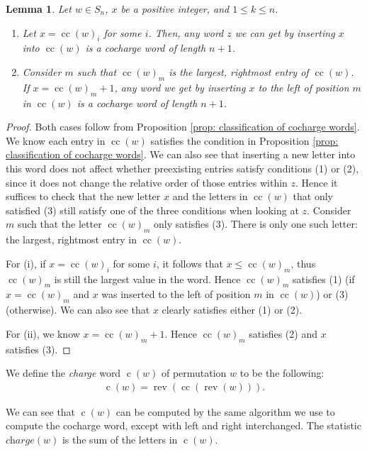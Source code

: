 \documentclass[10pt]{amsart}
\theoremstyle{plain}
\theoremstyle{definition}
\theoremstyle{plain}
\newtheorem{lemma}[lemma]{Lemma}
\theoremstyle{plain}
\theoremstyle{remark}
\theoremstyle{plain}
\theoremstyle{plain}
\DeclareMathOperator{\rev}{rev}
\DeclareMathOperator{\cc}{cc}
\DeclareMathOperator{\cw}{c}
\begin{document}
\begin{lemma}\label{lemma: adding a repeated cocharge value is still a cc word}
Let $w\in S_n$, $x$ be a positive integer, and $1\leq k\leq n$. 
\begin{enumerate}[label=(\roman*)]
    \item Let $x = \cc(w)_i$ for some $i$. Then, any word $z$ we can get by inserting $x$ into $\cc(w)$ is a cocharge word of length $n+1$.
    \item Consider $m$ such that $\cc(w)_m$ is the largest, rightmost entry of $\cc(w)$. If $x = \cc(w)_m + 1$, any word we get by inserting $x$ to the left of position $m$ in $\cc(w)$ is a cocharge word of length $n+1$.
\end{enumerate}

\end{lemma}
\begin{proof}
Both cases follow from Proposition \ref{prop: classification of cocharge words}.
We know each entry in  $\cc(w)$ satisfies the condition in Proposition \ref{prop: classification of cocharge words}. We can also see that inserting a new letter into this word does not affect whether preexisting entries satisfy conditions (1) or (2), since it does not change the relative order of those entries within $z$. 
Hence it suffices to check that the new letter $x$ and the letters in $\cc(w)$ that only satisfied (3) still satisfy one of the three conditions when looking at $z$.
 Consider $m$ such that the letter $\cc(w)_m$ only satisfies (3). There is only one such letter: the largest, rightmost entry in $\cc(w)$. 

 For (i),  if $x = \cc(w)_i$ for some $i$, it follows that  $x \leq \cc(w)_m$, thus $\cc(w)_m$ is still the largest value in the word. Hence $\cc(w)_m$ satisfies (1) (if $x = \cc(w)_m$ and $x$ was inserted to the left of position $m$ in $\cc(w)$)  or (3) (otherwise). We can also see that $x$ clearly satisfies either (1) or (2).

 For (ii), we know $x = \cc(w)_m+1$. Hence $\cc(w)_m$ satisfies (2) and $x$ satisfies (3).   
\end{proof}


We define the \textit{charge} word $\cw(w)$ of permutation $w$ to be the following: 
\begin{align}\label{eq: charge is reverse of cocharge of reverse}
    \cw(w)  = \rev(\cc(\rev(w))).
\end{align}

We can see that $\cw(w)$ can be computed by the same algorithm we use to compute the cocharge word, except with left and right interchanged. The statistic $\textit{charge}(w)$  is the sum of the letters in $\cw(w)$. 
\end{document}
